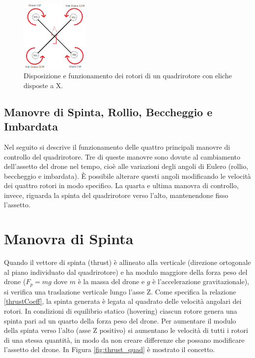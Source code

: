 \begin{figure}[H]
    \centering
    \includegraphics[width=0.3\textwidth]{gfx/rotori_quadrotor}
    \caption[Disposizione e funzionamento dei rotori di un quadrirotore con eliche disposte a X.]{Disposizione e funzionamento dei rotori di un quadrirotore con eliche disposte a X.}
    \label{fig:quadRotors}
\end{figure}

\subsection{Manovre di Spinta, Rollio, Beccheggio e Imbardata}

Nel seguito si descrive il funzionamento delle quattro principali manovre di controllo del quadrirotore. Tre di queste manovre sono dovute al cambiamento dell'assetto del drone nel tempo, cioè alle variazioni degli angoli di Eulero (rollio, beccheggio e imbardata). È possibile alterare questi angoli modificando le velocità dei quattro rotori in modo specifico. La quarta e ultima manovra di controllo, invece, riguarda la spinta del quadrirotore verso l'alto, mantenendone fisso l'assetto.

\section*{Manovra di Spinta}
Quando il vettore di spinta (thrust) è allineato alla verticale (direzione ortogonale al piano individuato dal quadrirotore) e ha modulo maggiore della forza peso del drone ($F_p = mg$ dove $m$ è la massa del drone e $g$ è l'accelerazione gravitazionale), si verifica una traslazione verticale lungo l'asse Z. Come specifica la relazione \ref{thrustCoeff}, la spinta generata è legata al quadrato delle velocità angolari dei rotori. In condizioni di equilibrio statico (hovering) ciascun rotore genera una spinta pari ad un quarto della forza peso del drone. Per aumentare il modulo della spinta verso l'alto (asse Z positivo) si aumentano le velocità di tutti i rotori di una stessa quantità, in modo da non creare differenze che possano modificare l'assetto del drone. In Figura \ref{fig:thrust_quad} è mostrato il concetto.

